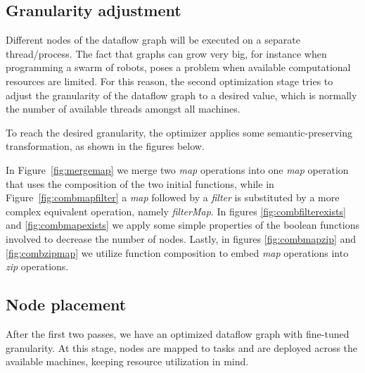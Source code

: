 \documentclass[sigplan,review,anonymous,screen]{acmart}
\begin{document}

\subsection{Granularity adjustment}

Different nodes of the dataflow graph will be executed on a separate
thread/process. The fact that graphs can grow very big, for instance when
programming a swarm of robots, poses a problem when available
computational resources are limited. For this reason, the second optimization
stage tries to adjust the granularity of the dataflow graph to a desired value,
which is normally the number of available threads amongst all machines.

To reach the desired granularity, the optimizer applies some semantic-preserving
transformation, as shown in the figures below.


In Figure~\ref{fig:mergemap} we merge two \textit{map} operations into
one \textit{map} operation that uses the composition of the two initial
functions, while in Figure~\ref{fig:combmapfilter} a \textit{map} followed
by a \textit{filter} is substituted by a more complex equivalent operation,
namely \textit{filterMap}. In figures \ref{fig:combfilterexists} and
\ref{fig:combmapexists} we apply some simple properties of the boolean functions
involved to decrease the number of nodes. Lastly, in figures \ref{fig:combmapzip} and
\ref{fig:combzipmap} we utilize function composition to embed \textit{map}
operations into \textit{zip} operations.

\subsection{Node placement}

After the first two passes, we have an optimized dataflow graph with fine-tuned
granularity. At this stage, nodes are mapped to tasks and are deployed across
the available machines, keeping resource utilization in mind.
\end{document}
